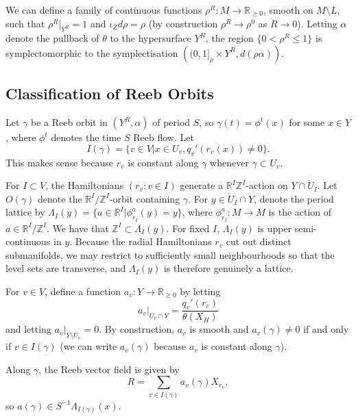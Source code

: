 \documentclass{article}
\numberwithin{equation}{section}
\numberwithin{figure}{section}
\begin{document}
We can define a family of continuous functions $\rho^R:M\rightarrow \mathbb{R}_{\geq 0}$, smooth on $M\setminus L$, such that $\rho^R|_{Y^R}=1$ and $\iota_Zd\rho=\rho$ (by construction $\rho^R\to \rho^0$ as $R\to 0$). Letting $\alpha$ denote the pullback of $\theta$ to the hypersurface $Y^R$, the region $\{0<\rho^R\leq 1\}$ is symplectomorphic to the symplectisation $\left((0,1]_\rho\times Y^R,d(\rho\alpha)\right)$.

\subsection{Classification of Reeb Orbits}
Let $\gamma$ be a Reeb orbit in $(Y^R,\alpha)$ of period $S$, so $\gamma(t)=\phi^t(x)$ for some $x\in Y$, where $\phi^t$ denotes the time $S$ Reeb flow.
Let 
\begin{equation}
    I(\gamma)=\{v\in V| x\in U_v, q_v'(r_v(x))\neq 0\}.
\end{equation}
This makes sense because $r_v$ is constant along $\gamma$ whenever $\gamma\subset U_v$.

For $I\subset V$, the Hamiltonians $(r_v:v\in I)$ generate a $\mathbb{R}^I\mathbb{Z}^I$-action on $Y\cap \mathring{U}_I$. Let $O(\gamma)$ denote the $\mathbb{R}^I/\mathbb{Z}^I$-orbit containing $\gamma$.
For $y\in \mathring{U}_I\cap Y$, denote the period lattice by $\Lambda_I(y)=\{a\in \mathbb{R}^I| \phi_{r_I}^{a}(y)=y\}$, where $\phi^a_{r_I}:M\rightarrow M$ is the action of $a\in\mathbb{R}^I/\mathbb{Z}^I$. We have that $\mathbb{Z}^I\subset \Lambda_I(y)$. For fixed $I$, $\Lambda_I(y)$ is upper semi-continuous in $y$. Because the radial Hamiltonians $r_v$ cut out distinct submanifolds, we may restrict to sufficiently small neighbourhoods so that the level sets are transverse, and $\Lambda_I(y)$ is therefore genuinely a lattice.

For $v\in V$, define a function $a_v:Y\rightarrow \mathbb{R}_{\geq 0}$ by letting
\begin{equation}
a_v|_{U_v\cap Y}=\frac{q_v'(r_v)}{\theta(X_H)}
\end{equation}
and letting $a_v|_{Y\setminus U_v}=0$. By construction, $a_v$ is smooth and $a_v(\gamma)\neq 0$ if and only if $v\in I(\gamma)$ (we can write $a_v(\gamma)$ because $a_v$ is constant along $\gamma$).

Along $\gamma$, the Reeb vector field is given by
\begin{equation}
\label{Reeb}
R=\sum_{v\in I(\gamma)}a_v(\gamma)X_{r_v},
\end{equation}
so $a(\gamma)\in S^{-1}\Lambda_{I(\gamma)}(x)$. 
\end{document}
